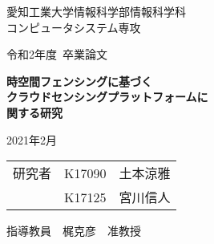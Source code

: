 \thispagestyle{myheadings}

\vspace{-1.0cm}

\begin{center}

{\LARGE 愛知工業大学情報科学部情報科学科\\
コンピュータシステム専攻

\vspace{1.0cm}

令和2年度~卒業論文\\

\vspace{2.0cm}

{\Huge 
\baselineskip=15mm
\textbf{時空間フェンシングに基づく\\
クラウドセンシングプラットフォームに\\
関する研究\\}}

\vspace{7.0cm}

2021年2月\\

\vspace{1.0cm}

\begin{tabular}[h]{lll}
  研究者  & K17090 & 土本涼雅\\
         & K17125 & 宮川信人\\
\end{tabular}

\vspace{1.0cm}

指導教員\ \ 梶克彦\ \ 准教授}

\end{center}

